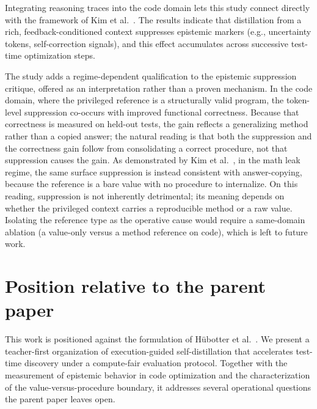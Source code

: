 Integrating reasoning traces into the code domain lets this study connect directly with the framework of Kim et al.~\cite{r2}. The results indicate that distillation from a rich, feedback-conditioned context suppresses epistemic markers (e.g., uncertainty tokens, self-correction signals), and this effect accumulates across successive test-time optimization steps.

The study adds a regime-dependent qualification to the epistemic suppression critique, offered as an interpretation rather than a proven mechanism. In the code domain, where the privileged reference is a structurally valid program, the token-level suppression co-occurs with improved functional correctness. Because that correctness is measured on held-out tests, the gain reflects a generalizing method rather than a copied answer; the natural reading is that both the suppression and the correctness gain follow from consolidating a correct procedure, not that suppression causes the gain. As demonstrated by Kim et al.~\cite{r2}, in the math leak regime, the same surface suppression is instead consistent with answer-copying, because the reference is a bare value with no procedure to internalize. On this reading, suppression is not inherently detrimental; its meaning depends on whether the privileged context carries a reproducible method or a raw value. Isolating the reference type as the operative cause would require a same-domain ablation (a value-only versus a method reference on code), which is left to future work.

\section{Position relative to the parent paper}\label{position-relative-to-the-parent-paper}

This work is positioned against the formulation of Hübotter et al.~\cite{r1}. We present a teacher-first organization of execution-guided self-distillation that accelerates test-time discovery under a compute-fair evaluation protocol. Together with the measurement of epistemic behavior in code optimization and the characterization of the value-versus-procedure boundary, it addresses several operational questions the parent paper leaves open.
